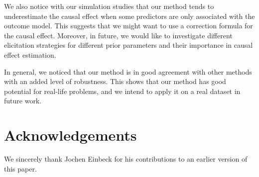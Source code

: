 \documentclass[preprint,12pt]{elsarticle}
\begin{document}
We also notice with our simulation studies that our
method tends to underestimate the causal effect
when some predictors are only associated with the
outcome model. This suggests that we might want
to use a correction formula for the causal effect.
Moreover, in future, we would
like to investigate different elicitation strategies for different prior parameters and their importance in causal effect estimation. 


In general, we noticed that our method
is in good agreement with other methods with an added level of robustness.
This shows that our method has good potential for real-life problems,
and we intend to apply it on a real dataset in future work.

\section*{Acknowledgements}

We sincerely thank Jochen Einbeck for his contributions to an earlier version of this paper.

 

\end{document}
